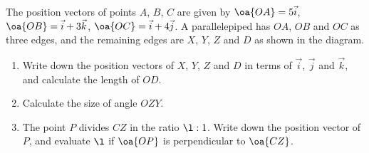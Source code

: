 \begin{problem}
    The position vectors of points $A$, $B$, $C$ are given by $\oa{OA} = 5\vec i$, $\oa{OB} = \vec i + 3\vec k$, $\oa{OC} = \vec i + 4\vec j$. A parallelepiped has $OA$, $OB$ and $OC$ as three edges, and the remaining edges are $X$, $Y$, $Z$ and $D$ as shown in the diagram.

    \begin{center}
    \end{center}

    \begin{enumerate}
        \item Write down the position vectors of $X$, $Y$, $Z$ and $D$ in terms of $\vec i$, $\vec j$ and $\vec k$, and calculate the length of $OD$.
        \item Calculate the size of angle $OZY$.
        \item The point $P$ divides $CZ$ in the ratio $\l : 1$. Write down the position vector of $P$, and evaluate $\l$ if $\oa{OP}$ is perpendicular to $\oa{CZ}$.
    \end{enumerate}
\end{problem}
